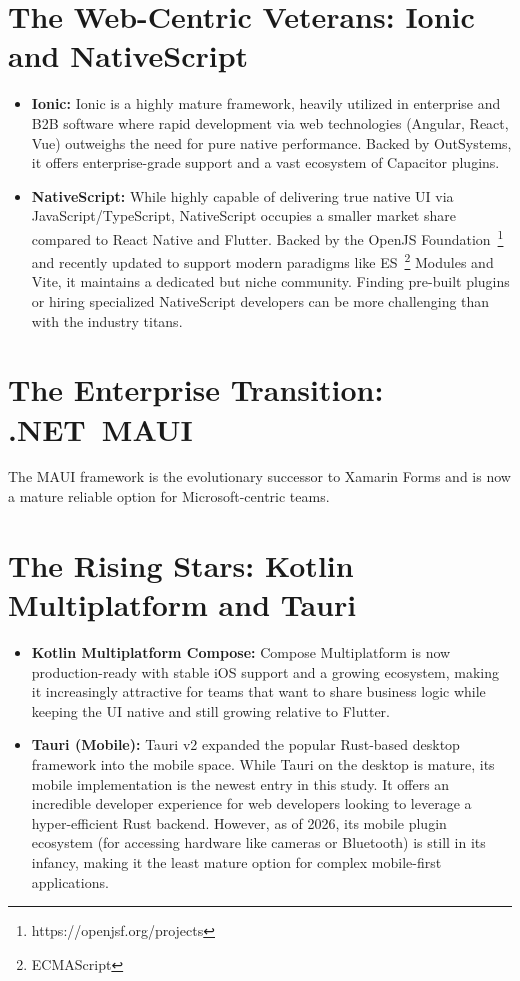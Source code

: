 \section{The Web-Centric Veterans: Ionic and NativeScript}
\begin{itemize}
    \item \textbf{Ionic:} Ionic is a highly mature framework, heavily utilized in enterprise and B2B software where rapid development via web technologies (Angular, React, Vue) outweighs the need for pure native performance. Backed by OutSystems, it offers enterprise-grade support and a vast ecosystem of Capacitor plugins.~\cite{Ionic:00}
    \item \textbf{NativeScript:} While highly capable of delivering true native UI via JavaScript/TypeScript, NativeScript occupies a smaller market share compared to React Native and Flutter. Backed by the OpenJS Foundation~\footnote{https://openjsf.org/projects} and recently updated to support modern paradigms like ES~\footnote{ECMAScript} Modules and Vite, it maintains a dedicated but niche community. Finding pre-built plugins or hiring specialized NativeScript developers can be more challenging than with the industry titans.
\end{itemize}

\section{The Enterprise Transition: \mbox{.NET~MAUI}}
The MAUI framework is the evolutionary successor to Xamarin Forms and is now a mature reliable option for Microsoft-centric teams.~\cite{Xamarin:00}

\section{The Rising Stars: Kotlin Multiplatform and Tauri}
\begin{itemize}
    \item \textbf{Kotlin Multiplatform Compose:} Compose Multiplatform is now production-ready with stable iOS support and a growing ecosystem, making it increasingly attractive for teams that want to share business logic while keeping the UI native and still growing relative to Flutter.~\cite{MAT:KMM:01}
    \item \textbf{Tauri (Mobile):} Tauri v2 expanded the popular Rust-based desktop framework into the mobile space. While Tauri on the desktop is mature, its mobile implementation is the newest entry in this study. It offers an incredible developer experience for web developers looking to leverage a hyper-efficient Rust backend. However, as of 2026, its mobile plugin ecosystem (for accessing hardware like cameras or Bluetooth) is still in its infancy, making it the least mature option for complex mobile-first applications.~\cite{MAT:TAU:01}
\end{itemize}

